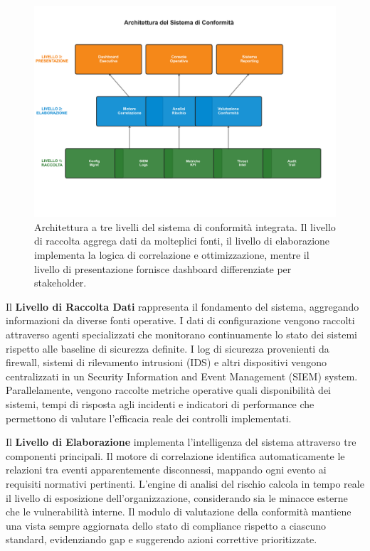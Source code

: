 \begin{figure}[h]
\centering
\includegraphics[width=\textwidth]{thesis_figures/cap4/figura_4_2_architettura_LARGE.pdf}
\caption{Architettura a tre livelli del sistema di conformità integrata. Il livello di raccolta aggrega dati da molteplici fonti, il livello di elaborazione implementa la logica di correlazione e ottimizzazione, mentre il livello di presentazione fornisce dashboard differenziate per stakeholder.}
\label{fig:architettura}
\end{figure}

Il \textbf{Livello di Raccolta Dati} rappresenta il fondamento del sistema, aggregando informazioni da diverse fonti operative. I dati di configurazione vengono raccolti attraverso agenti specializzati che monitorano continuamente lo stato dei sistemi rispetto alle baseline di sicurezza definite. I log di sicurezza provenienti da firewall, sistemi di rilevamento intrusioni (IDS) e altri dispositivi vengono centralizzati in un Security Information and Event Management (SIEM) system. Parallelamente, vengono raccolte metriche operative quali disponibilità dei sistemi, tempi di risposta agli incidenti e indicatori di performance che permettono di valutare l'efficacia reale dei controlli implementati.

Il \textbf{Livello di Elaborazione} implementa l'intelligenza del sistema attraverso tre componenti principali. Il motore di correlazione identifica automaticamente le relazioni tra eventi apparentemente disconnessi, mappando ogni evento ai requisiti normativi pertinenti. L'engine di analisi del rischio calcola in tempo reale il livello di esposizione dell'organizzazione, considerando sia le minacce esterne che le vulnerabilità interne. Il modulo di valutazione della conformità mantiene una vista sempre aggiornata dello stato di compliance rispetto a ciascuno standard, evidenziando gap e suggerendo azioni correttive prioritizzate.

